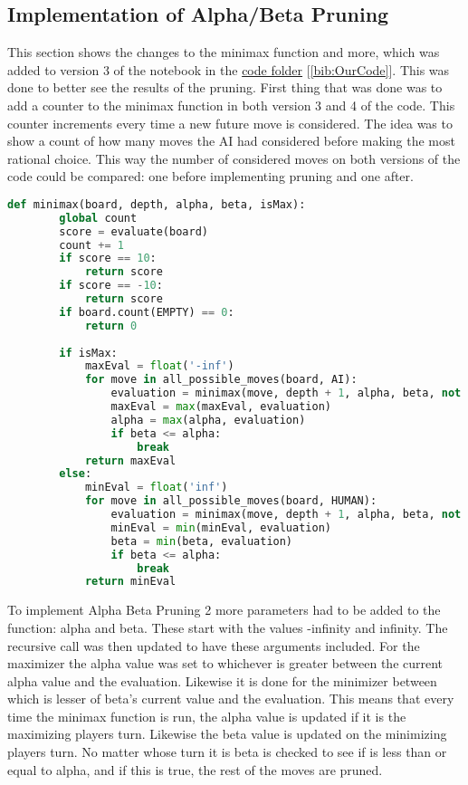 \subsection{Implementation of Alpha/Beta Pruning}
\label{subsec:Implementation of Alpha/Beta Pruning}
This section shows the changes to the minimax function and more, which was added to version 3 of the notebook in the \href{https://github.com/FrederikBlem/UFO_Exam_Minimax_Paper/tree/main/code}{code folder} [\ref{bib:OurCode}]. This was done to better see the results of the pruning. 
First thing that was done was to add a counter to the minimax function in both version 3 and 4 of the code. This counter increments every time a new future move is considered. 
The idea was to show a count of how many moves the AI had considered before making the most rational choice. This way the number of considered moves on both versions of the code could be compared:
one before implementing pruning and one after.
\begin{lstlisting}[language=python, caption={python example}, label={Script}, basicstyle=\ttfamily\small]
    def minimax(board, depth, alpha, beta, isMax):
        global count 
        score = evaluate(board)
        count += 1
        if score == 10: 
            return score
        if score == -10:
            return score
        if board.count(EMPTY) == 0:
            return 0
        
        if isMax:
            maxEval = float('-inf')
            for move in all_possible_moves(board, AI):
                evaluation = minimax(move, depth + 1, alpha, beta, not isMax)
                maxEval = max(maxEval, evaluation)
                alpha = max(alpha, evaluation)
                if beta <= alpha:
                    break
            return maxEval
        else:
            minEval = float('inf')
            for move in all_possible_moves(board, HUMAN):
                evaluation = minimax(move, depth + 1, alpha, beta, not isMax)
                minEval = min(minEval, evaluation)
                beta = min(beta, evaluation)
                if beta <= alpha:
                    break
            return minEval
\end{lstlisting}
To implement Alpha Beta Pruning 2 more parameters had to be added to the function: alpha and beta. These start with the values -infinity and infinity.
The recursive call was then updated to have these arguments included. For the maximizer the alpha value was set to whichever is greater between the current alpha value and the evaluation.
Likewise it is done for the minimizer between which is lesser of beta's current value and the evaluation. This means that every time the minimax function is run, the alpha value is updated if it is the maximizing players turn. 
Likewise the beta value is updated on the minimizing players turn.
No matter whose turn it is beta is checked to see if is less than or equal to alpha, and if this is true, the rest of the moves are pruned.
\clearpage